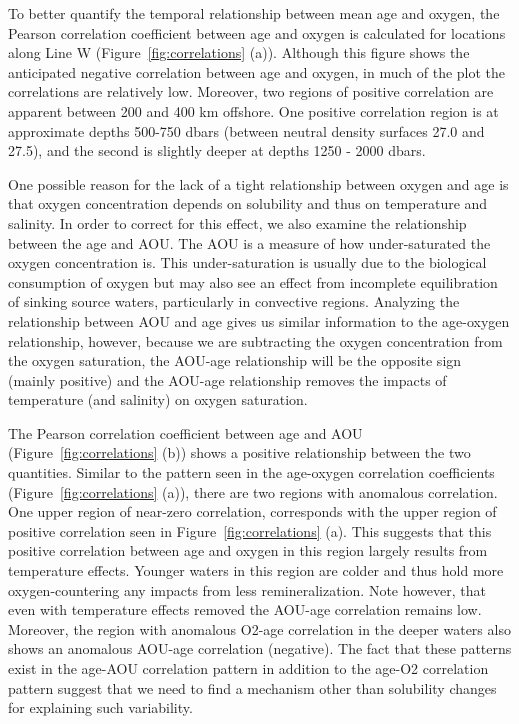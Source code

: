 To better quantify the temporal relationship between mean age and oxygen, the
Pearson correlation coefficient between age and oxygen is calculated for
locations along Line W (Figure~\ref{fig:correlations} (a)).  Although this figure shows the anticipated
negative correlation between age and oxygen, in much of the plot the correlations
are relatively low.  Moreover, two regions of positive correlation are apparent
between 200 and 400 km offshore. One positive correlation region is at approximate
depths 500-750 dbars (between neutral density surfaces 27.0 and 27.5), and the
second is slightly deeper at depths 1250 - 2000 dbars.

One possible reason for the lack of a tight relationship between oxygen and age
is that oxygen concentration depends on solubility and thus on temperature and
salinity. In order to correct for this effect, we also examine the relationship
between the age and AOU. The AOU is a measure of how under-saturated the oxygen
concentration is. This under-saturation is usually due to the biological
consumption of oxygen but may also see an effect from incomplete equilibration
of sinking source waters, particularly in convective regions. Analyzing the
relationship between AOU and age gives us similar information to the age-oxygen
relationship, however, because we are subtracting the oxygen concentration from
the oxygen saturation, the AOU-age relationship will be the opposite sign
(mainly positive) and the AOU-age relationship removes the impacts of temperature
(and salinity) on oxygen saturation.

The Pearson correlation coefficient between age and AOU
(Figure~\ref{fig:correlations} (b)) shows a positive relationship between the
two quantities.  Similar to the pattern seen in the age-oxygen correlation
coefficients (Figure~\ref{fig:correlations} (a)), there are two regions with
anomalous correlation. One upper region of near-zero correlation, corresponds
with the upper region of positive correlation seen in Figure~\ref{fig:correlations}
(a). This suggests that this positive correlation between age and oxygen in this
region largely results from temperature effects. Younger waters in this region
are colder and thus hold more oxygen-countering any impacts from less
remineralization. Note however, that even with temperature effects removed the
AOU-age correlation remains low. Moreover, the region with anomalous O2-age
correlation in the deeper waters also shows an anomalous AOU-age correlation
(negative).  The fact that these patterns exist in the age-AOU correlation pattern
in addition to the age-O2 correlation pattern suggest that we need to find a
mechanism other than solubility changes for explaining such variability.

